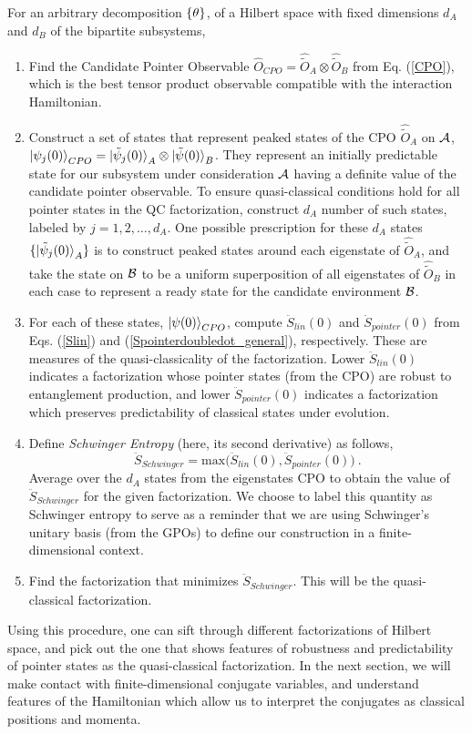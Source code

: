 \documentclass[aps,pra,onecolumn,nofootinbib,11pt,tightenlines]{revtex4-1}
\begin{document}
For an arbitrary decomposition ${\{\theta\}}$, {of a Hilbert space with fixed dimensions $d_A$ and $d_B$ of the bipartite subsystems,}
\begin{enumerate}
\item{Find the Candidate Pointer Observable $\hat{O}_{CPO} = \hat{\tilde{O}}_{A} \otimes \hat{\tilde{O}}_{B} $ from Eq. (\ref{CPO}), which is the best tensor product observable compatible with the interaction Hamiltonian. }
\item{Construct a set of states that represent peaked states of the CPO $\hat{\tilde{O}}_{A}$ on $\mathcal{A}$, $\ket{\psi_{j}(0)}_{CPO} = \ket{\tilde{\psi}_{j} (0)}_{A} \otimes \ket{\tilde{\psi} (0)}_{B}$. They represent an initially predictable state for our subsystem under consideration $\mathcal{A}$ having a definite value of the candidate pointer observable. To ensure quasi-classical conditions hold for all pointer states in the QC factorization, construct $d_A$ number of such states, labeled by $j = 1,2,\ldots,d_{A}$. One possible prescription for these $d_A$ states $\{\ket{\tilde{\psi}_{j} (0)}_{A}\}$ is to construct peaked states around each eigenstate of $\hat{\tilde{O}}_{A}$, and take the state on $\mathcal{B}$ to be a uniform superposition of all eigenstates of $\hat{\tilde{O}}_{B}$ in each case to represent a ready state for the candidate environment $\mathcal{B}$. }
\item{For each of these states, $\ket{\psi(0)}_{CPO}$, compute $\ddot{S}_{lin}(0)$ and $\ddot{S}_{pointer}(0)$ from Eqs. (\ref{Slin}) and (\ref{Spointerdoubledot_general}), respectively. These are measures of the quasi-classicality of the factorization. Lower $\ddot{S}_{lin}(0)$ indicates a factorization whose pointer states (from the CPO) are robust to entanglement production, and lower $\ddot{S}_{pointer}(0)$ indicates a factorization which preserves predictability of classical states under evolution.}
\item{Define \emph{Schwinger Entropy} (here, its second derivative) as follows,
\begin{equation}
\label{S_schwinger}
\ddot{S}_{Schwinger} = \mathrm{max} \biggl(\ddot{S}_{lin}(0), \ddot{S}_{pointer}(0) \biggr) \: .
\end{equation}
Average over the $d_A$ states from the eigenstates CPO to obtain the value of $\ddot{S}_{Schwinger}$ for the given factorization. We choose to label this quantity as Schwinger entropy to serve as a reminder that we are  using Schwinger's unitary basis (from the GPOs) to define our construction in a finite-dimensional context.}
\item{Find the factorization that minimizes $\ddot{S}_{Schwinger}$. This will be the quasi-classical factorization.}
\end{enumerate}
Using this procedure, one can sift through different factorizations of Hilbert space, and pick out the one that shows features of robustness and predictability of pointer states as the quasi-classical factorization. In the next section, we will make contact with finite-dimensional conjugate variables, and understand features of the Hamiltonian which allow us to interpret the conjugates as classical positions and momenta.
\end{document}
